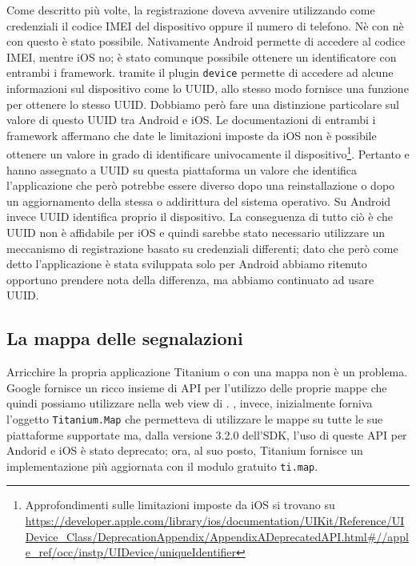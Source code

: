 			Come descritto più volte, la registrazione doveva avvenire utilizzando 
			come credenziali il codice IMEI del dispositivo oppure il numero di telefono.
			Nè con \pg{} nè con \tisdk{} questo è stato possibile. Nativamente 
			Android permette di accedere al codice IMEI, mentre iOS no; è stato 
			comunque possibile ottenere un identificatore con entrambi i 
			framework. \pg{} tramite il plugin \texttt{device} permette di accedere 
			ad alcune informazioni sul dispositivo come lo UUID, allo stesso 
			modo \tisdk{} fornisce una funzione per ottenere lo stesso UUID.
			Dobbiamo però fare una distinzione particolare sul valore di questo 
			UUID tra Android e iOS. 
			Le documentazioni di entrambi i framework affermano che date le limitazioni 
			imposte da iOS non è possibile ottenere un valore in grado di identificare 
			univocamente il dispositivo\footnote{Approfondimenti sulle limitazioni 
			imposte da iOS si trovano su \url{https://developer.apple.com/library/ios/documentation/UIKit/Reference/UIDevice_Class/DeprecationAppendix/AppendixADeprecatedAPI.html\#//apple_ref/occ/instp/UIDevice/uniqueIdentifier}}. 
			Pertanto \pg{} e \tisdk{} hanno assegnato a UUID su questa piattaforma 
			un valore che identifica l'applicazione che però potrebbe essere diverso 
			dopo una reinstallazione o dopo 
			un aggiornamento della stessa o addirittura del sistema operativo. 
			Su Android invece UUID 
			identifica proprio il dispositivo. La conseguenza di tutto ciò è che 
			UUID non è affidabile per iOS e quindi sarebbe stato necessario utilizzare 
			un meccanismo di registrazione basato su credenziali differenti; 
			dato che però come detto l'applicazione è stata sviluppata solo per Android 
			abbiamo ritenuto opportuno prendere nota della differenza, ma abbiamo 
			continuato ad usare UUID.
			
			
		\subsection{La mappa delle segnalazioni}
			Arricchire la propria applicazione Titanium o \pg{} con una mappa
			non è un problema. Google fornisce un ricco insieme di API \js{} per
			l'utilizzo delle proprie mappe che quindi possiamo utilizzare nella
			web view di \pg{}. \tisdk, invece, inizialmente forniva l'oggetto
			\texttt{Titanium.Map} che permetteva di utilizzare le mappe su tutte
			le sue piattaforme supportate ma, dalla versione 3.2.0 dell'SDK, l'uso
			di queste API per Andorid e iOS è stato deprecato; ora, al suo posto,
			Titanium fornisce un implementazione più aggiornata con	il modulo
			gratuito \texttt{ti.map}.
			
